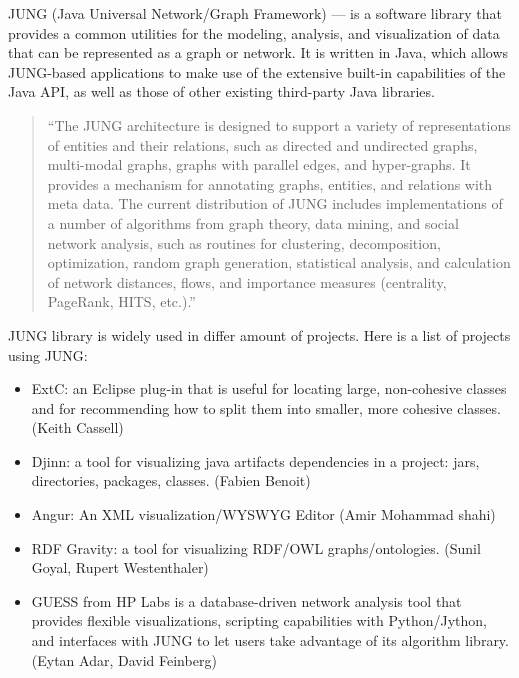 \begin{enumerate}
JUNG (Java Universal Network/Graph Framework) --- is a software library that provides a common utilities for the modeling, analysis, and visualization of data that can be represented as a graph or network. It is written in Java, which allows JUNG-based applications to make use of the extensive built-in capabilities of the Java API, as well as those of other existing third-party Java libraries.

\begin{quotation}
``The JUNG architecture is designed to support a variety of representations of entities and their relations,
such as directed and undirected graphs, multi-modal graphs, graphs with parallel edges, and hyper-graphs.
It provides a mechanism for annotating graphs, entities, and relations with meta data.
The current distribution of JUNG includes implementations of a number of algorithms from graph theory,
data mining, and social network analysis, such as routines for clustering, decomposition, optimization,
random graph generation, statistical analysis, and calculation of network distances, flows,
and importance measures (centrality, PageRank, HITS, etc.).''~\cite{JUNG_OVERVIEW}
\end{quotation}

JUNG library is widely used in differ amount of projects. Here is a list of projects using JUNG:

\begin{itemize}

\item ExtC: an Eclipse plug-in that is useful for locating large, non-cohesive classes and for recommending how to split them into smaller, more cohesive classes. (Keith Cassell)~\cite{EXTC}

\item Djinn: a tool for visualizing java artifacts dependencies in a project: jars, directories, packages, classes. (Fabien Benoit)~\cite{DJINN}

\item Angur: An XML visualization/WYSWYG Editor (Amir Mohammad shahi)~\cite{ANGUR}

\item RDF Gravity: a tool for visualizing RDF/OWL graphs/ontologies. (Sunil Goyal, Rupert Westenthaler)~\cite{RDF_GRAVITY}

\item GUESS from HP Labs is a database-driven network analysis tool that provides flexible visualizations, scripting capabilities with Python/Jython, and interfaces with JUNG to let users take advantage of its algorithm library. (Eytan Adar, David Feinberg)~\cite{GUESS}


\end{itemize}
\end{enumerate}

